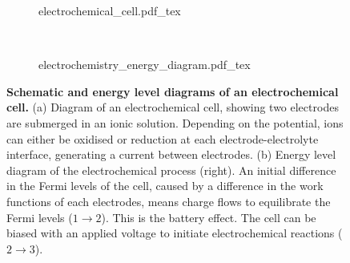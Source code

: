 \documentclass{article}
\begin{document}
\begin{figure}
\centering
{\small
\begin{subfigure}[t]{0.4\textwidth}
	\def\svgwidth{\textwidth}{electrochemical_cell.pdf_tex}
	\label{fig:electrochemical_cell}
\end{subfigure}
~
\begin{subfigure}[t]{0.45\textwidth}
	\def\svgwidth{\textwidth}{electrochemistry_energy_diagram.pdf_tex}
	\label{fig:electrochemistry_energy_diagram}
\end{subfigure}
}
\caption[Schematic and energy level diagrams of an electrochemical cell]{\textbf{Schematic and energy level diagrams of an electrochemical cell.} (a) Diagram of an electrochemical cell, showing two electrodes are submerged in an ionic solution. Depending on the potential, ions can either be oxidised or reduction at each electrode-electrolyte interface, generating a current between electrodes. (b) Energy level diagram of the electrochemical process (right). An initial difference in the Fermi levels of the cell, caused by a difference in the work functions of each electrodes, means charge flows to equilibrate the Fermi levels ($1\rightarrow2$). This is the battery effect. The cell can be biased with an applied voltage to initiate electrochemical reactions ($2\rightarrow3$).}
\end{figure}
\end{document}
